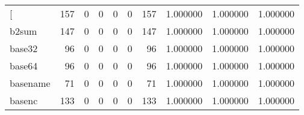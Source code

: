 \begin{longtable}{lrrrrrrrrr}
\bottomrule
\endlastfoot
{[}         &                                   157 &                                                  0 &                                                  0 &                                                  0 &                                                  0 &                                                157 &                                           1.000000 &                               1.000000 &                             1.000000 \\
b2sum     &                                   147 &                                                  0 &                                                  0 &                                                  0 &                                                  0 &                                                147 &                                           1.000000 &                               1.000000 &                             1.000000 \\
base32    &                                    96 &                                                  0 &                                                  0 &                                                  0 &                                                  0 &                                                 96 &                                           1.000000 &                               1.000000 &                             1.000000 \\
base64    &                                    96 &                                                  0 &                                                  0 &                                                  0 &                                                  0 &                                                 96 &                                           1.000000 &                               1.000000 &                             1.000000 \\
basename  &                                    71 &                                                  0 &                                                  0 &                                                  0 &                                                  0 &                                                 71 &                                           1.000000 &                               1.000000 &                             1.000000 \\
basenc    &                                   133 &                                                  0 &                                                  0 &                                                  0 &                                                  0 &                                                133 &                                           1.000000 &                               1.000000 &                             1.000000 \\

\end{longtable}
